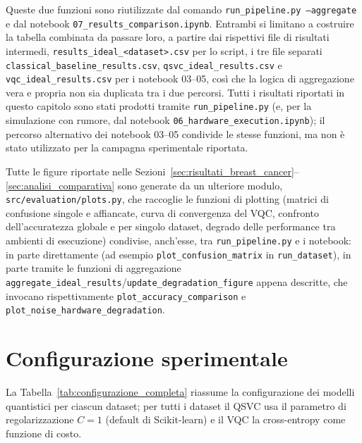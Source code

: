 Queste due funzioni sono riutilizzate dal comando \newline\texttt{run\_pipeline.py --aggregate} e dal notebook \texttt{07\_results\_comparison.ipynb}.
Entrambi si limitano a costruire la tabella combinata da passare loro, a partire dai rispettivi file di risultati intermedi, \texttt{results\_ideal\_<dataset>.csv} per lo script, i tre file separati \texttt{classical\_baseline\_results.csv}, \texttt{qsvc\_ideal\_results.csv} e \texttt{vqc\_ideal\_results.csv} per i notebook 03--05, così che la logica di aggregazione vera e propria non sia duplicata tra i due percorsi. Tutti i risultati riportati in questo capitolo sono stati prodotti tramite \texttt{run\_pipeline.py} (e, per la simulazione con rumore, dal notebook \texttt{06\_hardware\_execution.ipynb}); il percorso alternativo dei notebook 03--05 condivide le stesse funzioni, ma non è stato utilizzato per la campagna sperimentale riportata.

Tutte le figure riportate nelle Sezioni~\ref{sec:risultati_breast_cancer}--\ref{sec:analisi_comparativa} sono generate da un ulteriore modulo, \texttt{src/evaluation/plots.py}, che raccoglie le funzioni di plotting (matrici di confusione singole e affiancate, curva di convergenza del VQC, confronto dell'accuratezza globale e per singolo dataset, degrado delle performance tra ambienti di esecuzione) condivise, anch'esse, tra \texttt{run\_pipeline.py} e i notebook: in parte direttamente (ad esempio \texttt{plot\_confusion\_matrix} in \texttt{run\_dataset}), in parte tramite le funzioni di aggregazione \newline\texttt{aggregate\_ideal\_results}/\texttt{update\_degradation\_figure} appena descritte, che invocano rispettivamente \texttt{plot\_accuracy\_comparison} e \newline\texttt{plot\_noise\_hardware\_degradation}.

\section{Configurazione sperimentale}
\label{sec:configurazione_sperimentale}

La Tabella~\ref{tab:configurazione_completa} riassume la configurazione dei modelli quantistici per ciascun dataset; per tutti i dataset il QSVC usa il parametro di regolarizzazione $C = 1$ (default di Scikit-learn) e il VQC la cross-entropy come funzione di costo.

